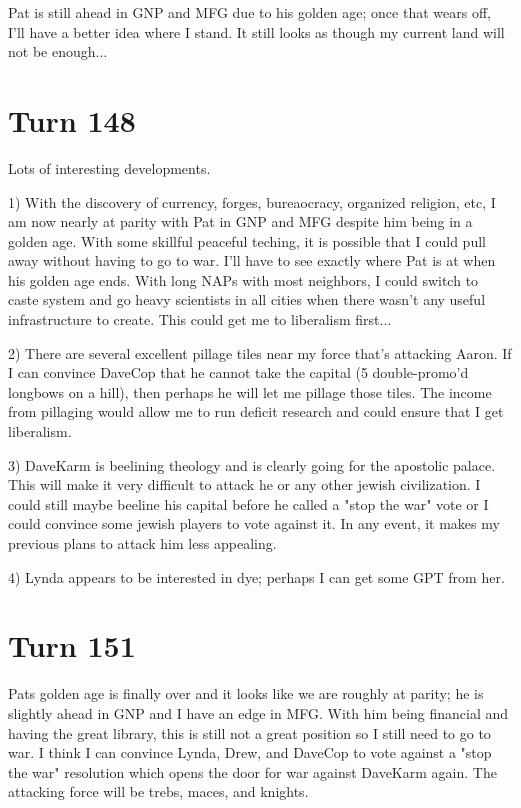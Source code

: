 \documentclass[10pt]{article}
\begin{document}
Pat is still ahead in GNP and MFG due to his golden age; once that
wears off, I'll have a better idea where I stand. It still looks as
though my current land will not be enough...

\section*{Turn 148}

Lots of interesting developments.

1) With the discovery of currency, forges, bureaocracy, organized
religion, etc, I am now nearly at parity with Pat in GNP and MFG
despite him being in a golden age. With some skillful peaceful
teching, it is possible that I could pull away without having to go to
war. I'll have to see exactly where Pat is at when his golden age
ends. With long NAPs with most neighbors, I could switch to caste
system and go heavy scientists in all cities when there wasn't any
useful infrastructure to create. This could get me to liberalism
first...

2) There are several excellent pillage tiles near my force that's
attacking Aaron. If I can convince DaveCop that he cannot take the
capital (5 double-promo'd longbows on a hill), then perhaps he will
let me pillage those tiles. The income from pillaging would allow me
to run deficit research and could ensure that I get liberalism.

3) DaveKarm is beelining theology and is clearly going for the
apostolic palace. This will make it very difficult to attack he or any
other jewish civilization. I could still maybe beeline his capital
before he called a "stop the war" vote or I could convince some jewish
players to vote against it. In any event, it makes my previous plans
to attack him less appealing.

4) Lynda appears to be interested in dye; perhaps I can get some GPT from her.

\section*{Turn 151}

Pats golden age is finally over and it looks like we are roughly at
parity; he is slightly ahead in GNP and I have an edge in MFG. With
him being financial and having the great library, this is still not a
great position so I still need to go to war. I think I can convince
Lynda, Drew, and DaveCop to vote against a "stop the war" resolution
which opens the door for war against DaveKarm again. The attacking
force will be trebs, maces, and knights.
\end{document}
